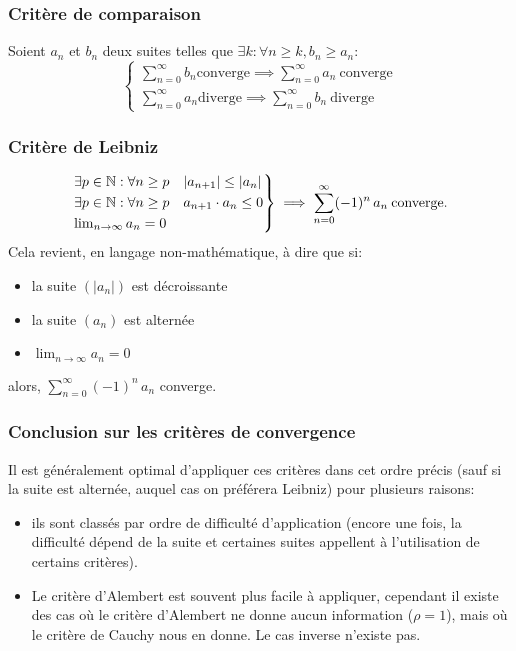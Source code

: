 \documentclass{article}
\begin{document}
\subsubsection{Critère de comparaison}
Soient \(a_n\) et \(b_n\) deux suites telles que \(\exists k : \forall n \geq k, b_n \geq a_n\):
\begin{equation*}
	\begin{cases}
		\sum_{n=0}^\infty b_n \text{converge} \implies \sum_{n=0}^\infty a_n \ \text{converge} \\
		\sum_{n=0}^\infty a_n \text{diverge} \implies \sum_{n=0}^\infty b_n \ \text{diverge}
	\end{cases}
\end{equation*}

\subsubsection{Critère de Leibniz}
\begin{equation*}
	\begin{rcases} %
		\exists p \in \mathbb{N} : \forall n \geq p \quad |a_{n+1}| \leq |a_n| \\
		\exists p \in \mathbb{N} : \forall n \geq p \quad a_{n+1} \cdot a_n \leq 0 \\
		\lim_{n \to \infty} a_n = 0
	\end{rcases}
	\implies \sum_{n=0}^\infty (-1)^n \, a_n \: \text{converge.}
\end{equation*}
Cela revient, en langage non-mathématique, à dire que si:
\begin{itemize}
	\item la suite \( (|a_n|) \) est décroissante
	\item la suite \( (a_n) \) est alternée
	\item \( \lim_{n \to \infty} a_n = 0 \)
\end{itemize}
alors, \(\sum_{n=0}^\infty (-1)^n \, a_n\) converge.

\subsubsection{Conclusion sur les critères de convergence}
Il est généralement optimal d'appliquer ces critères dans cet ordre précis (sauf si la suite est alternée, auquel cas on préférera Leibniz) pour plusieurs raisons:
\begin{itemize}
	\item ils sont classés par ordre de difficulté d'application (encore une fois, la difficulté dépend de la suite et certaines suites appellent à l'utilisation de certains critères). %
	\item Le critère d'Alembert est souvent plus facile à appliquer, cependant il existe des cas où le critère d'Alembert ne donne aucun information (\(\rho = 1\)), mais où le critère de Cauchy nous en donne. Le cas inverse n'existe pas.
\end{itemize}
\end{document}
